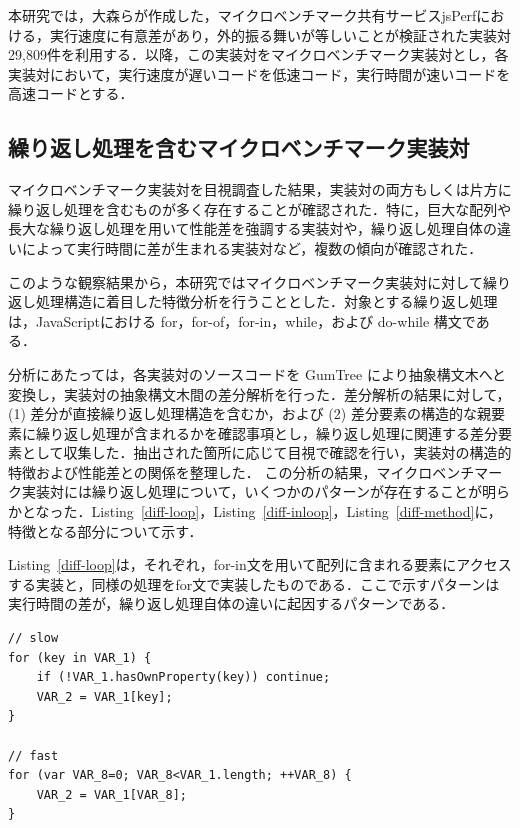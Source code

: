 \documentclass[submit,techrep,noauthor]{ipsj}
\newcommand{\todo}[1]{\colorbox{yellow}{{\bf TODO}:}{\color{red} {\textbf{[#1]}}}}
\begin{document}
本研究では，大森ら\cite{omori}が作成した，マイクロベンチマーク共有サービスjsPerfにおける，実行速度に有意差があり，外的振る舞いが等しいことが検証された実装対29,809件を利用する．以降，この実装対をマイクロベンチマーク実装対とし，各実装対において，実行速度が遅いコードを低速コード，実行時間が速いコードを高速コードとする．

\subsection{繰り返し処理を含むマイクロベンチマーク実装対}
\label{section3.1}


マイクロベンチマーク実装対を目視調査した結果，実装対の両方もしくは片方に繰り返し処理を含むものが多く存在することが確認された．特に，巨大な配列や長大な繰り返し処理を用いて性能差を強調する実装対や，繰り返し処理自体の違いによって実行時間に差が生まれる実装対など，複数の傾向が確認された．

このような観察結果から，本研究ではマイクロベンチマーク実装対に対して繰り返し処理構造に着目した特徴分析を行うこととした．対象とする繰り返し処理は，JavaScriptにおける for，for-of，for-in，while，および do-while 構文である．

分析にあたっては，各実装対のソースコードを GumTree \cite{gumtree}により抽象構文木へと変換し，実装対の抽象構文木間の差分解析を行った．差分解析の結果に対して，(1) 差分が直接繰り返し処理構造を含むか，および (2) 差分要素の構造的な親要素に繰り返し処理が含まれるかを確認事項とし，繰り返し処理に関連する差分要素として収集した．抽出された箇所に応じて目視で確認を行い，実装対の構造的特徴および性能差との関係を整理した．
この分析の結果，マイクロベンチマーク実装対には繰り返し処理について，いくつかのパターンが存在することが明らかとなった．Listing~\ref{diff-loop}，Listing~\ref{diff-inloop}，Listing~\ref{diff-method}に，特徴となる部分について示す．

Listing~\ref{diff-loop}は，それぞれ，for-in文を用いて配列に含まれる要素にアクセスする実装と，同様の処理をfor文で実装したものである．ここで示すパターンは実行時間の差が，繰り返し処理自体の違いに起因するパターンである．
\begin{lstlisting}[caption=Pairs with loop differences, label=diff-loop, captionpos=t, columns=flexible]
// slow
for (key in VAR_1) {
    if (!VAR_1.hasOwnProperty(key)) continue;
    VAR_2 = VAR_1[key];
}

// fast
for (var VAR_8=0; VAR_8<VAR_1.length; ++VAR_8) {
    VAR_2 = VAR_1[VAR_8];
}
\end{lstlisting}
\end{document}
